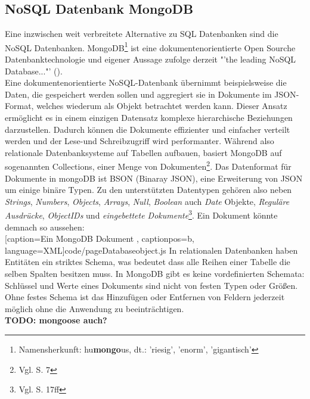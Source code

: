 \subsection{NoSQL Datenbank MongoDB}
Eine inzwischen weit verbreitete Alternative zu \gls{SQL} Datenbanken sind die \gls{NoSQL} Datenbanken. MongoDB\footnote{ Namensherkunft: hu\textbf{mongo}us, dt.: 'riesig', 'enorm', 'gigantisch'} ist eine dokumentenorientierte Open Sourche Datenbanktechnologie und eigener Aussage zufolge derzeit "'the leading NoSQL Database..."' (\cite{mongodb}). \\
Eine dokumentenorientierte \gls{NoSQL}-Datenbank übernimmt beispielsweise die Daten, die gespeichert werden sollen und aggregiert sie in Dokumente im \gls{JSON}-Format, welches wiederum als Objekt betrachtet werden kann. Dieser Ansatz ermöglicht es in einem einzigen Datensatz komplexe hierarchische Beziehungen darzustellen. Dadurch können die Dokumente effizienter und einfacher verteilt werden und der Lese-und Schreibzugriff wird performanter. Während also relationale Datenbanksysteme auf Tabellen aufbauen, basiert MongoDB auf sogenannten Collections, einer Menge von Dokumenten\footnote{Vgl. \cite{mongoDef} S. 7}. Das Datenformat für Dokumente in mongoDB ist BSON (Binaray JSON), eine Erweiterung von \gls{JSON} um einige binäre Typen. Zu den unterstützten Datentypen gehören also neben \textit{Strings}, \textit{Numbers}, \textit{Objects}, \textit{Arrays}, \textit{Null}, \textit{Boolean} auch \textit{Date} Objekte, \textit{Reguläre Ausdrücke}, \textit{ObjectIDs} und \textit{eingebettete Dokumente}\footnote{Vgl. \cite{mongoDef} S. 17ff}. Ein Dokument könnte demnach so aussehen: \\

	[caption={Ein MongoDB Dokument}
	\label{code:mongo}, captionpos=b, language=XML]{code/pageDatabaseobject.js}
In relationalen Datenbanken haben Entitäten ein striktes Schema, was bedeutet dass alle Reihen einer Tabelle die selben Spalten besitzen muss. In MongoDB gibt es keine vordefinierten Schemata: Schlüssel und Werte eines Dokuments sind nicht von festen Typen oder Größen. Ohne festes Schema ist das Hinzufügen oder Entfernen von Feldern jederzeit möglich ohne die Anwendung zu beeinträchtigen.\\
\textbf{\large TODO: mongoose auch?}
